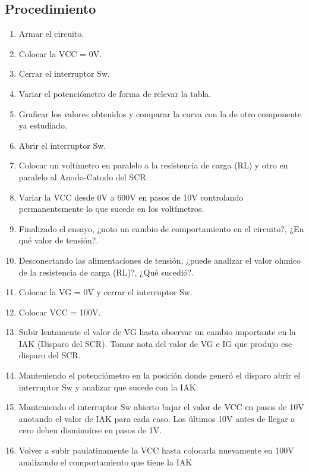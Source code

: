   \subsection{Procedimiento}
  \begin{enumerate}
    \item Armar el circuito.
    \item Colocar la VCC = 0V.
    \item Cerrar el interruptor Sw.
    \item Variar el potenciómetro de forma de relevar la tabla.
    \item Graficar los valores obtenidos y comparar la curva con la de otro
      componente ya estudiado.
    \item Abrir el interruptor Sw.
    \item Colocar un voltímetro en paralelo a la resistencia de carga (RL) y otro en paralelo al Anodo-Catodo del SCR.
    \item Variar la VCC desde 0V a 600V en pasos de 10V controlando permanentemente lo que sucede en los voltímetros.
    \item Finalizado el ensayo, ¿noto un cambio de comportamiento en el circuito?, ¿En qué valor de tensión?.
    \item Desconectando las alimentaciones de tensión, ¿puede analizar el valor ohmico de la 
      resistencia de carga (RL)?, ¿Qué sucedió?.
    \item Colocar la VG = 0V y cerrar el interruptor Sw.
    \item Colocar VCC = 100V.
    \item Subir lentamente el valor de VG hasta observar un cambio importante en la IAK (Disparo del SCR). 
      Tomar nota del valor de VG e IG que produjo ese disparo del SCR.
    \item Manteniendo el potenciómetro en la posición donde generó el disparo abrir el 
      interruptor Sw y analizar que sucede con la IAK.
    \item Manteniendo el interruptor Sw abierto bajar el valor de VCC en pasos de 10V 
      anotando el valor de IAK para cada caso. Los últimos 10V antes de llegar a cero deben disminuirse en pasos de 1V.
    \item Volver a subir paulatinamente la VCC hasta colocarla nuevamente en 100V
      analizando el comportamiento que tiene la IAK
  \end{enumerate}
